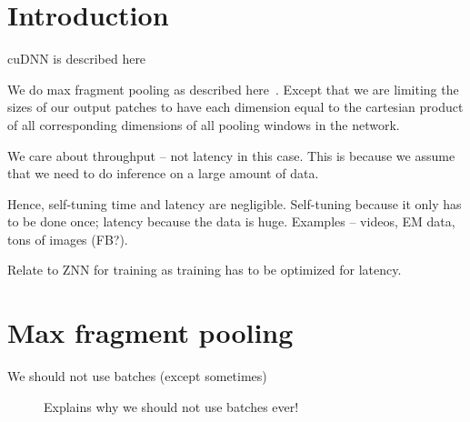 \documentclass[conference]{IEEEtran}
\begin{document}

\section{Introduction}

cuDNN is described here~\cite{chetlur2014cudnn}

We do max fragment pooling as described here~\cite{giusti2013fast}.
Except that we are limiting the sizes of our output patches to have
each dimension equal to the cartesian product of all corresponding
dimensions of all pooling windows in the network.

We care about throughput -- not latency in this case.  This is because
we assume that we need to do inference on a large amount of data.

Hence, self-tuning time and latency are negligible.  Self-tuning
because it only has to be done once; latency because the data is huge.
Examples -- videos, EM data, tons of images (FB?).

Relate to ZNN for training as training has to be optimized for
latency.

\section{Max fragment pooling}

We should not use batches (except sometimes)

\begin{figure}
  \centering

  \caption{Explains why we should not use batches ever!}
  \label{fig:batch_explanation}
\end{figure}
\end{document}
